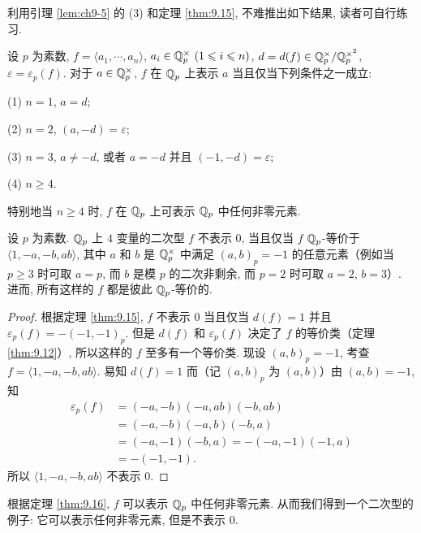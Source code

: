 利用引理 \ref{lem:ch9-5} 的 (3) 和定理 \ref{thm:9.15}, 不难推出如下结果, 读者可自行练习.

\begin{theorem}\label{thm:9.16}
设 $p$ 为素数, $f=\langle a_1,\cdots,a_n\rangle$, $a_i\in\mathbb{Q}_p^{\times}\ (1\leqslant i\leqslant n)$, $d=d(f)\in\mathbb{Q}_p^{\times}/\mathbb{Q}_p^{\times^2}$, $\varepsilon=\varepsilon_p(f)$. 对于 $a\in\mathbb{Q}_p^{\times}$, $f$ 在 $\mathbb{Q}_p$ 上表示 $a$ 当且仅当下列条件之一成立:

(1) $n=1$, $a=d$;

(2) $n=2$, $(a,-d)=\varepsilon$;

(3) $n=3$, $a\neq -d$, 或者 $a=-d$ 并且 $(-1,-d)=\varepsilon$;

(4) $n\geqslant 4$.

特别地当 $n\geqslant 4$ 时, $f$ 在 $\mathbb{Q}_p$ 上可表示 $\mathbb{Q}_p$ 中任何非零元素.
\end{theorem}

\begin{example}
设 $p$ 为素数. $\mathbb{Q}_p$ 上 $4$ 变量的二次型 $f$ 不表示 $0$, 当且仅当 $f$ $\mathbb{Q}_p$-等价于 $\langle 1,-a,-b,ab\rangle$, 其中 $a$ 和 $b$ 是 $\mathbb{Q}_p^{\times}$ 中满足 $(a,b)_p=-1$ 的任意元素（例如当 $p\geqslant 3$ 时可取 $a=p$, 而 $b$ 是模 $p$ 的二次非剩余, 而 $p=2$ 时可取 $a=2$, $b=3$）. 进而, 所有这样的 $f$ 都是彼此 $\mathbb{Q}_p$-等价的.
\end{example}

\begin{proof}
根据定理 \ref{thm:9.15}, $f$ 不表示 $0$ 当且仅当 $d(f)=1$ 并且 $\varepsilon_p(f)=-(-1,-1)_p$. 但是 $d(f)$ 和 $\varepsilon_p(f)$ 决定了 $f$ 的等价类（定理 \ref{thm:9.12}）, 所以这样的 $f$ 至多有一个等价类. 现设 $(a,b)_p=-1$, 考查 $f=\langle 1,-a,-b,ab\rangle$. 易知 $d(f)=1$ 而（记 $(a,b)_p$ 为 $(a,b)$）由 $(a,b)=-1$, 知
\[
  \begin{aligned}
    \varepsilon_p(f)&=(-a,-b)(-a,ab)(-b,ab)\\
    &=(-a,-b)(-a,b)(-b,a)\\
    &=(-a,-1)(-b,a)=-(-a,-1)(-1,a)\\
    &=-(-1,-1).
  \end{aligned}
\]
所以 $\langle 1,-a,-b,ab\rangle$ 不表示 $0$.
\end{proof}

\begin{remark}
根据定理 \ref{thm:9.16}, $f$ 可以表示 $\mathbb{Q}_p$ 中任何非零元素. 从而我们得到一个二次型的例子: 它可以表示任何非零元素, 但是不表示 $0$.
\end{remark}

